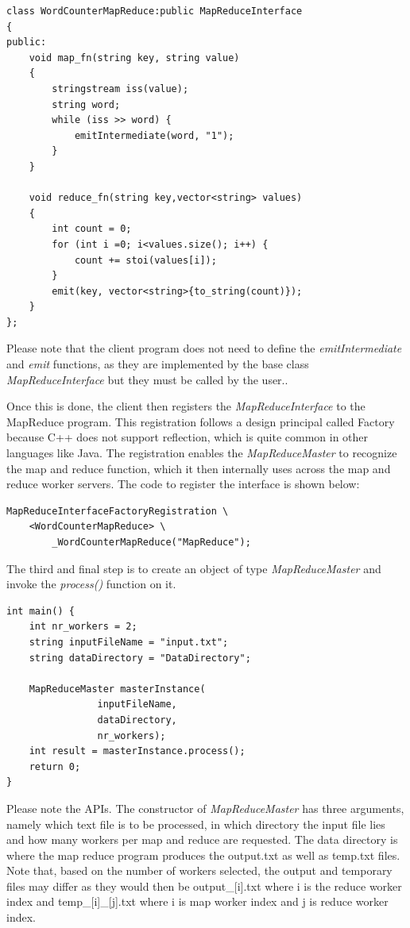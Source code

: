 \documentclass[conference, a4paper]{IEEEtran_ID}
\begin{document}
\begin{lstlisting}
class WordCounterMapReduce:public MapReduceInterface
{
public:
    void map_fn(string key, string value)
    {
        stringstream iss(value);
        string word;
        while (iss >> word) {
            emitIntermediate(word, "1");
        }
    }

    void reduce_fn(string key,vector<string> values)
    {
        int count = 0;
        for (int i =0; i<values.size(); i++) {
            count += stoi(values[i]);
        }
        emit(key, vector<string>{to_string(count)});
    }
};
\end{lstlisting}
Please note that the client program does not need to define the \textit{emitIntermediate} and \textit{emit} functions, as they are implemented by the base class \textit{MapReduceInterface} but they must be called by the user..

Once this is done, the client then registers the \textit{MapReduceInterface} to the MapReduce program. This registration follows a design principal called Factory because C++ does not support reflection, which is quite common in other languages like Java. The registration enables the \textit{MapReduceMaster} to recognize the map and reduce function, which it then internally uses across the map and reduce worker servers. The code to register the interface is shown below:
\begin{lstlisting}
MapReduceInterfaceFactoryRegistration \
    <WordCounterMapReduce> \
        _WordCounterMapReduce("MapReduce");
\end{lstlisting}

The third and final step is to create an object of type \textit{MapReduceMaster} and invoke the \textit{process()} function on it.
\begin{lstlisting}
int main() {
    int nr_workers = 2;
    string inputFileName = "input.txt";
    string dataDirectory = "DataDirectory";

    MapReduceMaster masterInstance(
                inputFileName,
                dataDirectory,
                nr_workers);
    int result = masterInstance.process();
    return 0;
}
\end{lstlisting}
Please note the APIs. The constructor of \textit{MapReduceMaster} has three arguments, namely which text file is to be processed, in which directory the input file lies and how many workers per map and reduce are requested. The data directory is where the map reduce program produces the output.txt as well as temp.txt files. Note that, based on the number of workers selected, the output and temporary files may differ as they would then be output\_[i].txt where i is the reduce worker index and temp\_[i]\_[j].txt where i is map worker index and j is reduce worker index.
\end{document}
